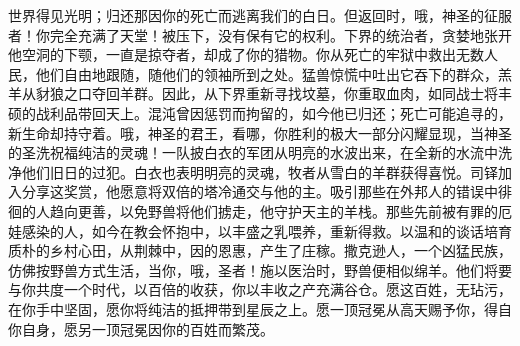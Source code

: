 世界得见光明；归还那因你的死亡而逃离我们的白日。\newline{}但返回时，哦，神圣的征服者！你完全充满了天堂！被压下，没有保有它的权利。下界的统治者，贪婪地张开他空洞的下颚，一直是掠夺者，却成了你的猎物。你从死亡的牢狱中救出无数人民，他们自由地跟随，随他们的领袖所到之处。猛兽惊慌中吐出它吞下的群众，羔羊从豺狼之口夺回羊群。因此，从下界重新寻找坟墓，你重取血肉，如同战士将丰硕的战利品带回天上。混沌曾因惩罚而拘留的，如今他已归还；死亡可能追寻的，新生命却持守着。\newline{}哦，神圣的君王，看哪，你胜利的极大一部分闪耀显现，当神圣的圣洗祝福纯洁的灵魂！一队披白衣的军团从明亮的水波出来，在全新的水流中洗净他们旧日的过犯。白衣也表明明亮的灵魂，牧者从雪白的羊群获得喜悦。司铎加入分享这奖赏，他愿意将双倍的塔冷通交与他的主。吸引那些在外邦人的错误中徘徊的人趋向更善，以免野兽将他们掳走，他守护天主的羊栈。那些先前被有罪的厄娃感染的人，如今在教会怀抱中，以丰盛之乳喂养，重新得救。以温和的谈话培育质朴的乡村心田，从荆棘中，因的恩惠，产生了庄稼。撒克逊人，一个凶猛民族，仿佛按野兽方式生活，当你，哦，圣者！施以医治时，野兽便相似绵羊。他们将要与你共度一个时代，以百倍的收获，你以丰收之产充满谷仓。愿这百姓，无玷污，在你手中坚固，愿你将纯洁的抵押带到星辰之上。愿一顶冠冕从高天赐予你，得自你自身，愿另一顶冠冕因你的百姓而繁茂。\par

